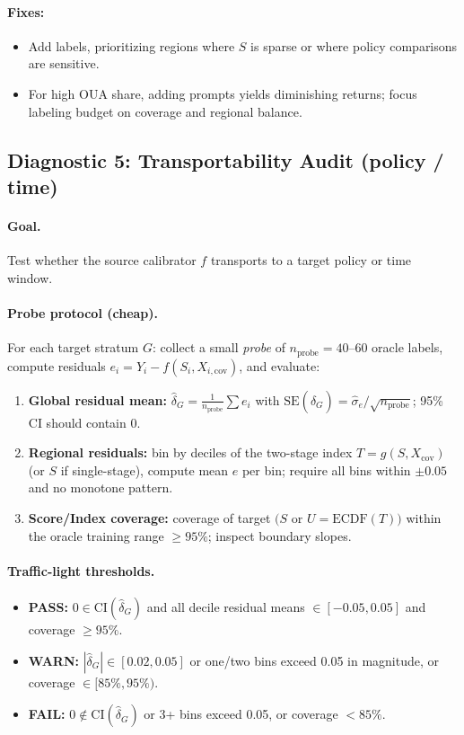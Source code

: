 \begin{enumerate}[resume]
\paragraph{Fixes:}
\begin{itemize}
\item Add labels, prioritizing regions where $S$ is sparse or where policy comparisons are sensitive.
\item For high OUA share, adding prompts yields diminishing returns; focus labeling budget on coverage and regional balance.
\end{itemize}

\subsection{Diagnostic 5: Transportability Audit (policy / time)}
\label{diag:transport}

\paragraph{Goal.} Test whether the source calibrator $f$ transports to a target policy or time window.

\paragraph{Probe protocol (cheap).} For each target stratum $G$:
collect a small \emph{probe} of $n_{\text{probe}}=40\text{--}60$ oracle labels,
compute residuals $e_i = Y_i - f(S_i,X_{i,\mathrm{cov}})$, and evaluate:

\begin{enumerate}
\item \textbf{Global residual mean:}
$\hat\delta_G = \frac{1}{n_{\text{probe}}}\sum e_i$ with
$\mathrm{SE}(\hat\delta_G) = \hat\sigma_e/\sqrt{n_{\text{probe}}}$;
95\% CI should contain $0$.
\item \textbf{Regional residuals:}
bin by deciles of the two-stage index $T=g(S,X_{\mathrm{cov}})$ (or $S$ if single-stage), compute mean $e$ per bin; require all bins within $\pm 0.05$ and no monotone pattern.
\item \textbf{Score/Index coverage:}
coverage of target $(S$ or $U=\mathrm{ECDF}(T))$ within the oracle training range $\ge 95\%$; inspect boundary slopes.
\end{enumerate}

\paragraph{Traffic-light thresholds.}
\begin{itemize}
\item \textbf{PASS:} $0 \in \text{CI}(\hat\delta_G)$ and all decile residual means $\in [-0.05,0.05]$ and coverage $\ge 95\%$.
\item \textbf{WARN:} $|\hat\delta_G| \in [0.02,0.05]$ or one/two bins exceed 0.05 in magnitude, or coverage $\in [85\%,95\%)$.
\item \textbf{FAIL:} $0 \notin \text{CI}(\hat\delta_G)$ or 3+ bins exceed 0.05, or coverage $<85\%$.
\end{itemize}


\end{enumerate}
